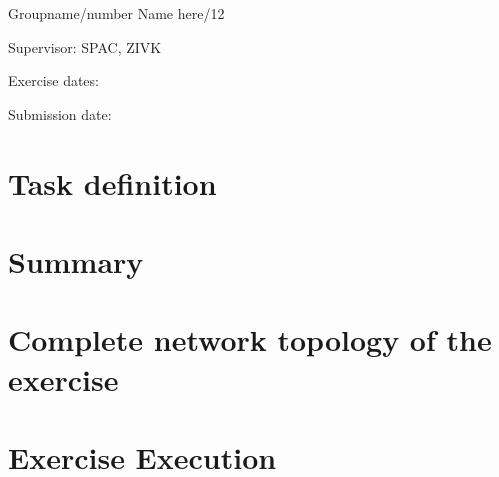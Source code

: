 \documentclass[a4paper]{article}
\begin{document}
Groupname/number Name here/12

Supervisor: 	SPAC, ZIVK

Exercise dates:	

Submission date:


\newpage
\tableofcontents

\newpage

\section{Task definition}



\section{Summary}

\newpage

\section{Complete network topology of the exercise}

\newpage

\section{Exercise Execution}
\end{document}
